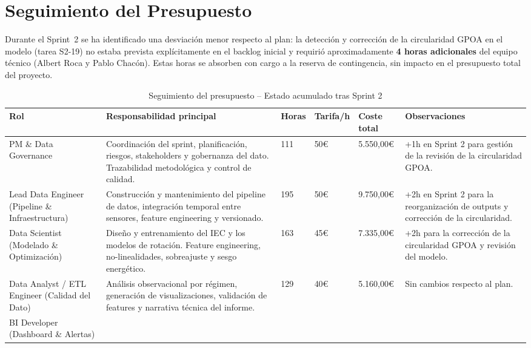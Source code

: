 \documentclass[12pt,a4paper]{article}
\begin{document}
\newpage
\section{Seguimiento del Presupuesto}

Durante el Sprint~2 se ha identificado una desviación menor respecto al plan: la detección y corrección de la circularidad GPOA en el modelo (tarea S2-19) no estaba prevista explícitamente en el backlog inicial y requirió aproximadamente \textbf{4 horas adicionales} del equipo técnico (Albert Roca y Pablo Chacón). Estas horas se absorben con cargo a la reserva de contingencia, sin impacto en el presupuesto total del proyecto.

\begin{table}[H]
\centering
\caption{Seguimiento del presupuesto -- Estado acumulado tras Sprint 2}
\label{tab:presupuesto}
\renewcommand{\arraystretch}{1.4}
\begin{tabularx}{\textwidth}{p{3cm} X p{1.5cm} p{1.5cm} p{2cm} p{2.5cm}}
\toprule
\textbf{Rol} & \textbf{Responsabilidad principal} & \textbf{Horas} & \textbf{Tarifa/h} & \textbf{Coste total} & \textbf{Observaciones} \\
\midrule
PM \& Data Governance
  & Coordinación del sprint, planificación, riesgos, stakeholders y gobernanza del dato. Trazabilidad metodológica y control de calidad.
  & 111 & 50\euro{} & 5.550,00\euro{}
  & +1h en Sprint 2 para gestión de la revisión de la circularidad GPOA. \\
Lead Data Engineer (Pipeline \& Infraestructura)
  & Construcción y mantenimiento del pipeline de datos, integración temporal entre sensores, feature engineering y versionado.
  & 195 & 50\euro{} & 9.750,00\euro{}
  & +2h en Sprint 2 para la reorganización de outputs y corrección de la circularidad. \\
Data Scientist (Modelado \& Optimización)
  & Diseño y entrenamiento del IEC y los modelos de rotación. Feature engineering, no-linealidades, sobreajuste y sesgo energético.
  & 163 & 45\euro{} & 7.335,00\euro{}
  & +2h para la corrección de la circularidad GPOA y revisión del modelo. \\
Data Analyst / ETL Engineer (Calidad del Dato)
  & Análisis observacional por régimen, generación de visualizaciones, validación de features y narrativa técnica del informe.
  & 129 & 40\euro{} & 5.160,00\euro{}
  & Sin cambios respecto al plan. \\
BI Developer (Dashboard \& Alertas)

\end{tabularx}
\end{table}
\end{document}
